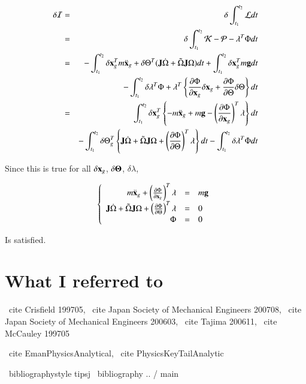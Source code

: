 \begin{eqnarray}
\delta{\cal I}
&=& \delta\int_{t_1}^{t_2} {\cal L} dt\\
&=& \delta\int_{t_1}^{t_2} {\cal K} - {\cal P} - \lambda^T\Phi dt\\
&=& - \int_{t_1}^{t_2}\delta\mathbf{x}_g^T m\ddot{\mathbf{x}}_g  + \delta\Theta^T(\mathbf{J}\dot{\Omega}+\tilde{\Omega}\mathbf{J}\Omega)dt + \int_{t_1}^{t_2}\delta\mathbf{x}_g^Tm\mathbf{g}dt  \\
&& - \int_{t_1}^{t_2}\delta\lambda^T\Phi  + \lambda^T\left\{\frac{\partial \Phi}{\partial \mathbf{x}_g}\delta\mathbf{x}_g + \frac{\partial\Phi}{\partial\Theta}\delta\Theta\right\}dt\\
&=& \int_{t_1}^{t_2}\delta\mathbf{x}_g^T\left\{-m\ddot{\mathbf{x}}_g+m\mathbf{g}-\left(\frac{\partial \Phi}{\partial \mathbf{x}_g}\right)^T\lambda\right\}dt\\
&&   - \int_{t_1}^{t_2}\delta\Theta_g^T\left\{\mathbf{J}\dot{\Omega}+\tilde{\Omega}\mathbf{J}\Omega+\left(\frac{\partial\Phi}{\partial\Theta}\right)^T\lambda\right\}dt   -   \int_{t_1}^{t_2}\delta\lambda^T\Phi dt
\end{eqnarray}

Since this is true for all $\delta\mathbf{x}_g$, $\delta\mathbf{\Theta}$, $\delta\lambda$,

\begin{eqnarray}
\left\{\begin{array}{rrl}
m\ddot{\mathbf{x}}_g + \left(\frac{\partial \Phi}{\partial \mathbf{x}_g}\right)^T\lambda &=& m\mathbf{g}\\
\mathbf{J}\dot{\Omega}+\tilde{\Omega}\mathbf{J}\Omega+\left(\frac{\partial\Phi}{\partial\Theta}\right)^T\lambda &=& 0\\
\Phi &=& 0\end{array}\right.
\end{eqnarray}

Is satisfied.

\section{What I referred to}

\ cite {Crisfield 199705}, \ cite {Japan Society of Mechanical Engineers 200708}, \ cite {Japan Society of Mechanical Engineers 200603}, \ cite {Tajima 200611}, \ cite {McCauley 199705}

\ cite {EmanPhysicsAnalytical}, \ cite {PhysicsKeyTailAnalytic}

\ bibliographystyle {tipsj}
\ bibliography {.. / main}
\fi


